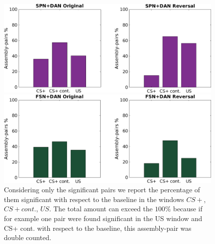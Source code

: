 \begin{figure}
    \centering
    \includegraphics[scale=0.4]{figures/SPN_DANHisto.png}
    
    \vspace{1cm}
    
    \includegraphics[scale=0.4]{figures/FSN_DANHisto.png}
\caption{Considering only the significant pairs we report the percentage of them significant with respect to the baseline in the windows $CS+$, $CS+ cont.$, $US$. The total amount can exceed the $100\%$ because if for example one pair were found significant in the US window and CS+ cont. with respect to the baseline, this assembly-pair was double counted.}
    \label{fig:FriedHistoDAN}
\end{figure}
